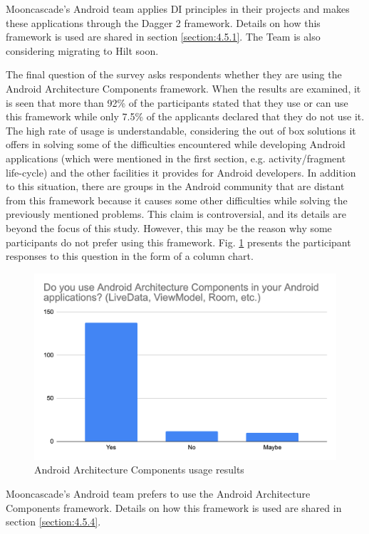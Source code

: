 Mooncascade's Android team applies DI principles in their projects and makes these applications through the Dagger 2 framework. Details on how this framework is used are shared in section \ref{section:4.5.1}. The Team is also considering migrating to Hilt soon.

The final question of the survey asks respondents whether they are using the Android Architecture Components framework. When the results are examined, it is seen that more than 92\% of the participants stated that they use or can use this framework while only 7.5\% of the applicants declared that they do not use it. The high rate of usage is understandable, considering the out of box solutions it offers in solving some of the difficulties encountered while developing Android applications (which were mentioned in the first section, e.g. activity/fragment life-cycle) and the other facilities it provides for Android developers. In addition to this situation, there are groups in the Android community that are distant from this framework because it causes some other difficulties while solving the previously mentioned problems. This claim is controversial, and its details are beyond the focus of this study. However, this may be the reason why some participants do not prefer using this framework. Fig. \ref{fig:arch_components} presents the participant responses to this question in the form of a column chart.
\begin{figure}[ht!]
    \centering
    \includegraphics[scale=0.25]{figures/arch_components.png}
    \caption{Android Architecture Components usage results}
    \label{fig:arch_components}
\end{figure}
\FloatBarrier

 Mooncascade's Android team prefers to use the Android Architecture Components framework. Details on how this framework is used are shared in section \ref{section:4.5.4}.